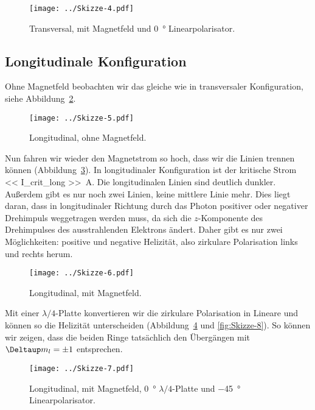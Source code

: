 \begin{figure}[htbp]
    \centering
    \texttt{[image: ../Skizze-4.pdf]}
    \caption{%
        Transversal, mit Magnetfeld und \SI{0}{\degree} Linearpolarisator.
    }
    \label{fig:Skizze-4}
\end{figure}

\subsection{Longitudinale Konfiguration}

Ohne Magnetfeld beobachten wir das gleiche wie in transversaler Konfiguration,
siehe Abbildung~\ref{fig:Skizze-5}.

\begin{figure}[htbp]
    \centering
    \texttt{[image: ../Skizze-5.pdf]}
    \caption{%
        Longitudinal, ohne Magnetfeld.
    }
    \label{fig:Skizze-5}
\end{figure}

Nun fahren wir wieder den Magnetstrom so hoch, dass wir die Linien trennen
können (Abbildung~\ref{fig:Skizze-6}). In longitudinaler Konfiguration ist der
kritische Strom \SI{<< I_crit_long >>}{\ampere}. Die longitudinalen Linien sind
deutlich dunkler. Außerdem gibt es nur noch zwei Linien, keine mittlere Linie
mehr. Dies liegt daran, dass in longitudinaler Richtung durch das Photon
positiver oder negativer Drehimpuls weggetragen werden muss, da sich die
$z$-Komponente des Drehimpulses des ausstrahlenden Elektrons ändert. Daher gibt
es nur zwei Möglichkeiten: positive und negative Helizität, also zirkulare
Polarisation links und rechts herum.

\begin{figure}[htbp]
    \centering
    \texttt{[image: ../Skizze-6.pdf]}
    \caption{%
        Longitudinal, mit Magnetfeld.
    }
    \label{fig:Skizze-6}
\end{figure}

Mit einer $\lambda/4$-Platte konvertieren wir die zirkulare Polarisation in
Lineare und können so die Helizität unterscheiden (Abbildung~\ref{fig:Skizze-7}
und \ref{fig:Skizze-8}). So können wir zeigen, dass die beiden Ringe
tatsächlich den Übergängen mit $\Deltaup m_l = \pm 1$ entsprechen.

\begin{figure}[htbp]
    \centering
    \texttt{[image: ../Skizze-7.pdf]}
    \caption{%
        Longitudinal, mit Magnetfeld, \SI{0}{\degree} $\lambda/4$-Platte und
        \SI{-45}{\degree} Linearpolarisator.
    }
    \label{fig:Skizze-7}
\end{figure}

